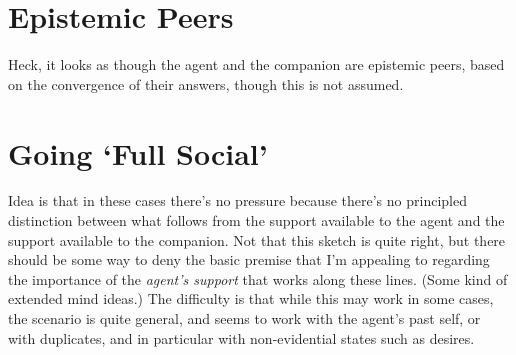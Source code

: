 \documentclass[10pt]{article}
\begin{document}
\section{Epistemic Peers}
\label{sec:epistemic-peers}

Heck, it looks as though the agent and the companion are epistemic peers, based on the convergence of their answers, though this is not assumed.

\section{Going `Full Social'}
\label{sec:going-full-social}

Idea is that in these cases there's no pressure because there's no principled distinction between what follows from the support available to the agent and the support available to the companion.
Not that this sketch is quite right, but there should be some way to deny the basic premise that I'm appealing to regarding the importance of the \emph{agent's support} that works along these lines.
(Some kind of extended mind ideas.)
The difficulty is that while this may work in some cases, the scenario is quite general, and seems to work with the agent's past self, or with duplicates, and in particular with non-evidential states such as desires.

\newpage

\printbibliography
\end{document}
